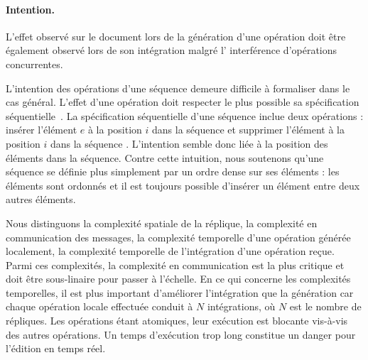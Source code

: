 
\paragraph{Intention.} L'effet observé sur le document lors de la génération
d'une opération doit être également observé lors de son intégration malgré l'
interférence d'opérations concurrentes.

\noindent L'intention des opérations d'une séquence demeure difficile à
formaliser dans le cas général. L'effet d'une opération doit respecter le plus
possible sa spécification séquentielle~\cite{bieniusa2012brief}. La
spécification séquentielle d'une séquence inclue deux opérations : \og insérer
l'élément $e$ à la position $i$ dans la séquence \fg et \og supprimer l'élément
à la position $i$ dans la séquence \fg. L'intention semble donc liée à la
position des éléments dans la séquence. Contre cette intuition, nous soutenons
qu'une séquence se définie plus simplement par un ordre dense sur ses éléments :
les éléments sont ordonnés et il est toujours possible d'insérer un élément
entre deux autres éléments.

Nous distinguons la complexité spatiale de la réplique, la complexité en
communication des messages, la complexité temporelle d'une opération générée
localement, la complexité temporelle de l'intégration d'une opération
reçue. Parmi ces complexités, la complexité en communication est la plus
critique et doit être sous-linaire pour passer à l'échelle. En ce qui concerne
les complexités temporelles, il est plus important d'améliorer l'intégration que
la génération car chaque opération locale effectuée conduit à $N$ intégrations,
où $N$ est le nombre de répliques.  Les opérations étant atomiques, leur
exécution est blocante vis-à-vis des autres opérations. Un temps d'exécution
trop long constitue un danger pour l'édition en temps réel.

